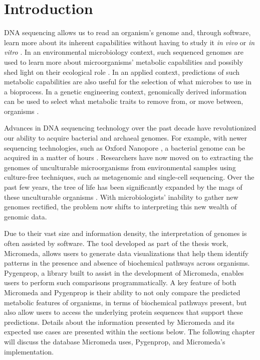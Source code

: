\chapter{Introduction} \label{introduction}

DNA sequencing allows us to read an organism's genome and, through software, 
learn more about its inherent capabilities without having to study it \textit{in 
vivo} or \textit{in vitro} \cite{de2012bioinformatic}. In an environmental 
microbiology context, such sequenced genomes are used to learn more about 
microorganisms' metabolic capabilities and possibly shed light on their 
ecological role \cite{de2012bioinformatic}. In an applied context, predictions 
of such metabolic capabilities are also useful for the selection of what 
microbes to use in a bioprocess. In a genetic engineering context, genomically 
derived information can be used to select what metabolic traits to remove from, 
or move between, organisms \cite{strohl2001biochemical,sanchez2005novel}.

Advances in DNA sequencing technology over the past decade have revolutionized 
our ability to acquire bacterial and archaeal genomes. For example, with newer 
sequencing technologies, such as Oxford Nanopore \cite{jain2016oxford}, a 
bacterial genome can be acquired in a matter of hours \cite{Lu2016,Cao2017}. 
Researchers have now moved on to extracting the genomes of unculturable 
microorganisms from environmental samples using culture-free techniques, such as 
metagenomic \cite{quince2017shotgun} and single-cell \cite{gawad2016single} 
sequencing. Over the past few years, the tree of life has been significantly 
expanded by the \gls{mags} \cite{bowers2017minimum} of these unculturable 
organisms \cite{Hug2016,Parks2017}. With microbiologists' inability to gather 
new genomes rectified, the problem now shifts to interpreting this new wealth of 
genomic data.

Due to their vast size and information density, the interpretation of genomes is 
often assisted by software. The tool developed as part of the thesis work, 
Micromeda, allows users to generate data visualizations that help them identify 
patterns in the presence and absence of biochemical pathways across organisms. 
Pygenprop, a library built to assist in the development of Micromeda, enables 
users to perform such comparisons programmatically. A key feature of both 
Micromeda and Pygenprop is their ability to not only compare the predicted 
metabolic features of organisms, in terms of biochemical pathways present, but 
also allow users to access the underlying protein sequences that support these 
predictions. Details about the information presented by Micromeda and its 
expected use cases are presented within the sections below. The following 
chapter will discuss the database Micromeda uses, Pygenprop, and Micromeda's 
implementation.

